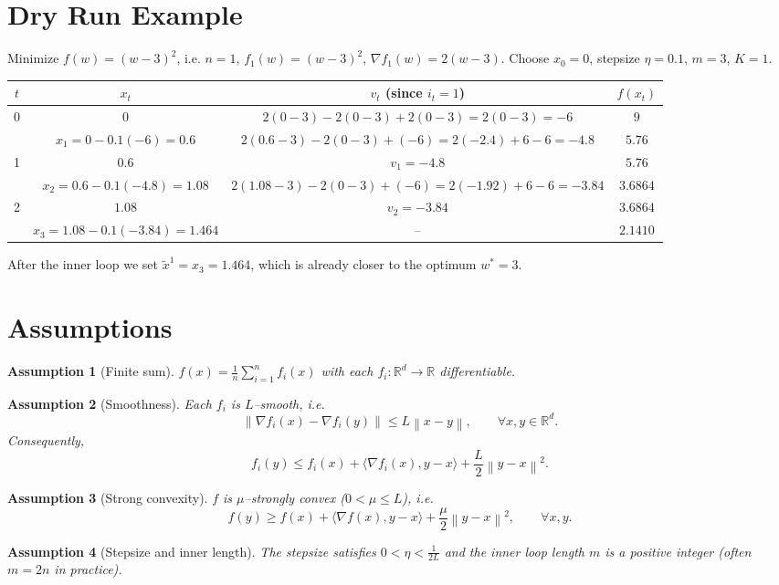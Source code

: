 \documentclass{article}
\newtheorem{assumption}{Assumption}
\newcommand{\norm}[1]{\left\|#1\right\|}
\newcommand{\inner}[2]{\langle #1,#2\rangle}
\begin{document}
\section*{Dry Run Example}
Minimize $f(w)=(w-3)^{2}$, i.e. $n=1$, $f_1(w)= (w-3)^2$, $\nabla f_1(w)=2(w-3)$.  
Choose $x_0=0$, stepsize $\eta=0.1$, $m=3$, $K=1$.

\begin{center}
\begin{tabular}{c|c|c|c}
$t$ & $x_t$ & $v_t$ (since $i_t=1$) & $f(x_t)$\\ \hline
0 & $0$ & $2(0-3)-2(0-3)+2(0-3)=2(0-3)=-6$ & $9$\\
  & $x_1=0-0.1(-6)=0.6$ & $2(0.6-3)-2(0-3)+(-6)=2(-2.4)+6-6=-4.8$ & $5.76$\\
1 & $0.6$ & $v_1=-4.8$ & $5.76$\\
  & $x_2=0.6-0.1(-4.8)=1.08$ & $2(1.08-3)-2(0-3)+(-6)=2(-1.92)+6-6=-3.84$ & $3.6864$\\
2 & $1.08$ & $v_2=-3.84$ & $3.6864$\\
  & $x_3=1.08-0.1(-3.84)=1.464$ & – & $2.1410$\\
\end{tabular}
\end{center}
After the inner loop we set $\tilde{x}^{1}=x_3=1.464$, which is already closer to the optimum $w^{*}=3$.

\newpage
\section*{Assumptions}
\begin{assumption}[Finite sum]\label{assump:finite}
$f(x)=\frac1n\sum_{i=1}^{n}f_i(x)$ with each $f_i:\mathbb{R}^{d}\to\mathbb{R}$ differentiable.
\end{assumption}
\begin{assumption}[Smoothness]\label{assump:smooth}
Each $f_i$ is $L$–smooth, i.e.
\[
\norm{\nabla f_i(x)-\nabla f_i(y)}\le L\norm{x-y},\qquad\forall x,y\in\mathbb{R}^{d}.
\]
Consequently,
\[
f_i(y)\le f_i(x)+\inner{\nabla f_i(x)}{y-x}+\frac{L}{2}\norm{y-x}^{2}.
\]
\end{assumption}
\begin{assumption}[Strong convexity]\label{assump:strong}
$f$ is $\mu$–strongly convex ($0<\mu\le L$), i.e.
\[
f(y)\ge f(x)+\inner{\nabla f(x)}{y-x}+\frac{\mu}{2}\norm{y-x}^{2},\qquad\forall x,y.
\]
\end{assumption}
\begin{assumption}[Stepsize and inner length]\label{assump:params}
The stepsize satisfies $0<\eta<\frac{1}{2L}$ and the inner loop length $m$ is a positive integer (often $m=2n$ in practice).
\end{assumption}
\end{document}
